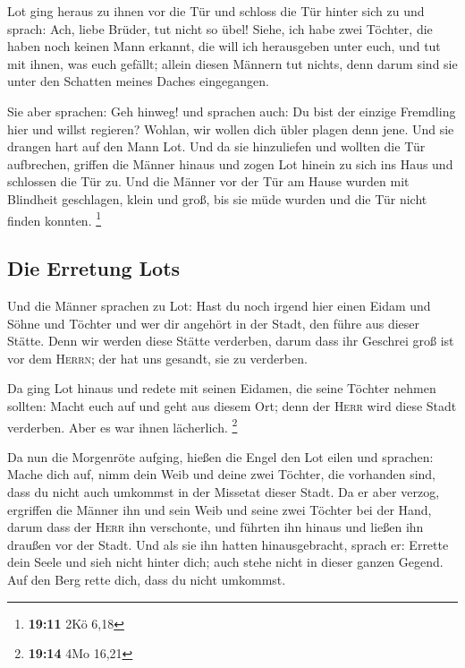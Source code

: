  Lot ging heraus zu ihnen vor die Tür und schloss die Tür
hinter sich zu  und sprach: Ach, liebe Brüder, tut nicht
so übel!  Siehe, ich habe zwei Töchter, die haben noch
keinen Mann erkannt, die will ich herausgeben unter euch, und tut mit
ihnen, was euch gefällt; allein diesen Männern tut nichts, denn darum
sind sie unter den Schatten meines Daches eingegangen.

 Sie aber sprachen: Geh hinweg! und sprachen auch: Du bist
der einzige Fremdling hier und willst regieren? Wohlan, wir wollen dich
übler plagen denn jene. Und sie drangen hart auf den Mann Lot. Und da
sie hinzuliefen und wollten die Tür aufbrechen,  griffen
die Männer hinaus und zogen Lot hinein zu sich ins Haus und schlossen
die Tür zu.  Und die Männer vor der Tür am Hause wurden
mit Blindheit geschlagen, klein und groß, bis sie müde wurden und die
Tür nicht finden konnten. \footnote{\textbf{19:11} 2Kö 6,18}

\hypertarget{die-erretung-lots}{%
\subsection{Die Erretung Lots}\label{die-erretung-lots}}

 Und die Männer sprachen zu Lot: Hast du noch irgend hier
einen Eidam und Söhne und Töchter und wer dir angehört in der Stadt, den
führe aus dieser Stätte.  Denn wir werden diese Stätte
verderben, darum dass ihr Geschrei groß ist vor dem \textsc{Herrn}; der
hat uns gesandt, sie zu verderben.

 Da ging Lot hinaus und redete mit seinen Eidamen, die
seine Töchter nehmen sollten: Macht euch auf und geht aus diesem Ort;
denn der \textsc{Herr} wird diese Stadt verderben. Aber es war ihnen
lächerlich. \footnote{\textbf{19:14} 4Mo 16,21}

 Da nun die Morgenröte aufging, hießen die Engel den Lot
eilen und sprachen: Mache dich auf, nimm dein Weib und deine zwei
Töchter, die vorhanden sind, dass du nicht auch umkommst in der Missetat
dieser Stadt.  Da er aber verzog, ergriffen die Männer
ihn und sein Weib und seine zwei Töchter bei der Hand, darum dass der
\textsc{Herr} ihn verschonte, und führten ihn hinaus und ließen ihn
draußen vor der Stadt.  Und als sie ihn hatten
hinausgebracht, sprach er: Errette dein Seele und sieh nicht hinter
dich; auch stehe nicht in dieser ganzen Gegend. Auf den Berg rette dich,
dass du nicht umkommst.

